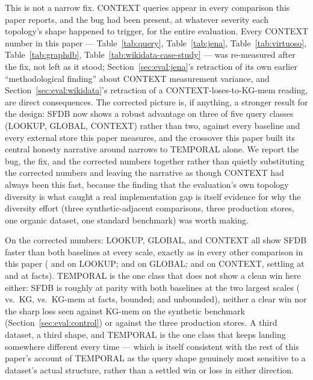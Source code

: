 This is not a narrow fix. CONTEXT queries appear in every comparison
this paper reports, and the bug had been present, at whatever severity
each topology's shape happened to trigger, for the entire evaluation.
Every CONTEXT number in this paper --- Table~\ref{tab:query},
Table~\ref{tab:jena}, Table~\ref{tab:virtuoso}, Table~\ref{tab:graphdb},
Table~\ref{tab:wikidata-case-study} --- was re-measured after the fix,
not left as it stood; Section~\ref{sec:eval:jena}'s retraction of its
own earlier ``methodological finding'' about CONTEXT measurement
variance, and Section~\ref{sec:eval:wikidata}'s retraction of a
CONTEXT-loses-to-KG-mem reading, are direct consequences. The corrected
picture is, if anything, a stronger result for the design: SFDB now
shows a robust advantage on three of five query classes
(LOOKUP, GLOBAL, CONTEXT) rather than two, against every baseline and
every external store this paper measures, and the crossover this paper
built its central honesty narrative around narrows to TEMPORAL alone.
We report the bug, the fix, and the corrected numbers together rather
than quietly substituting the corrected numbers and leaving the
narrative as though CONTEXT had always been this fast, because the
finding that the evaluation's own topology diversity is what caught a
real implementation gap is itself evidence for why the diversity effort
(three synthetic-adjacent comparisons, three production stores, one
organic dataset, one standard benchmark) was worth making.

On the corrected numbers: LOOKUP, GLOBAL, and CONTEXT all show SFDB
faster than both baselines at every scale, exactly as in every other
comparison in this paper (\rangelookuplubmkg{} and
\rangelookuplubmkgmem{} on LOOKUP; \rangegloballubmkg{} and
\rangegloballubmkgmem{} on GLOBAL; \rangecontextlubmkg{} and
\rangecontextlubmkgmem{} on CONTEXT, settling at \contextlubmkglarge{}
and \contextlubmkgmemlarge{} at \lubmlargescale{} facts). TEMPORAL is
the one class that does not show a clean win here either: SFDB is
roughly at parity with both baselines at the two largest scales
(\temporallubmkglarge{} vs.\ KG, \temporallubmkgmemlarge{} vs.\ KG-mem
at \lubmlargescale{} facts, bounded; \temporalunblubmkglarge{} and
\temporalunblubmkgmemlarge{} unbounded), neither a clear win nor the
sharp loss seen against KG-mem on the synthetic benchmark
(Section~\ref{sec:eval:control}) or against the three production
stores. A third dataset, a third shape, and TEMPORAL is the one class
that keeps landing somewhere different every time --- which is itself
consistent with the rest of this paper's account of TEMPORAL as the
query shape genuinely most sensitive to a dataset's actual structure,
rather than a settled win or loss in either direction.

